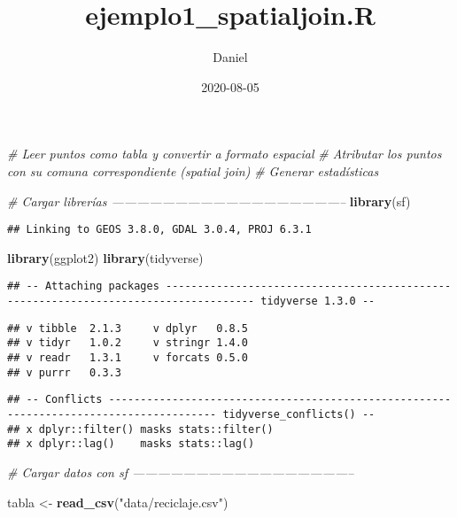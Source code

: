 \documentclass[]{article}
\title{ejemplo1\_spatialjoin.R}
\author{Daniel}
\date{2020-08-05}
\newenvironment{Shaded}{\begin{snugshade}}{\end{snugshade}}
\newcommand{\CommentTok}[1]{\textcolor[rgb]{0.56,0.35,0.01}{\textit{#1}}}
\newcommand{\KeywordTok}[1]{\textcolor[rgb]{0.13,0.29,0.53}{\textbf{#1}}}
\newcommand{\NormalTok}[1]{#1}
\newcommand{\StringTok}[1]{\textcolor[rgb]{0.31,0.60,0.02}{#1}}
\begin{document}
\maketitle

\begin{Shaded}
\begin{Highlighting}[]
\CommentTok{# Leer puntos como tabla y convertir a formato espacial}
\CommentTok{# Atributar los puntos con su comuna correspondiente (spatial join)}
\CommentTok{# Generar estadísticas}


\CommentTok{# Cargar librerías --------------------------------------------------------}
\KeywordTok{library}\NormalTok{(sf)}
\end{Highlighting}
\end{Shaded}

\begin{verbatim}
## Linking to GEOS 3.8.0, GDAL 3.0.4, PROJ 6.3.1
\end{verbatim}

\begin{Shaded}
\begin{Highlighting}[]
\KeywordTok{library}\NormalTok{(ggplot2)}
\KeywordTok{library}\NormalTok{(tidyverse)}
\end{Highlighting}
\end{Shaded}

\begin{verbatim}
## -- Attaching packages ------------------------------------------------------------------------------------ tidyverse 1.3.0 --
\end{verbatim}

\begin{verbatim}
## v tibble  2.1.3     v dplyr   0.8.5
## v tidyr   1.0.2     v stringr 1.4.0
## v readr   1.3.1     v forcats 0.5.0
## v purrr   0.3.3
\end{verbatim}

\begin{verbatim}
## -- Conflicts --------------------------------------------------------------------------------------- tidyverse_conflicts() --
## x dplyr::filter() masks stats::filter()
## x dplyr::lag()    masks stats::lag()
\end{verbatim}

\begin{Shaded}
\begin{Highlighting}[]
\CommentTok{# Cargar datos con sf -----------------------------------------------------}

\NormalTok{tabla <-}\StringTok{ }\KeywordTok{read_csv}\NormalTok{(}\StringTok{"data/reciclaje.csv"}\NormalTok{)}
\end{Highlighting}
\end{Shaded}
\end{document}
